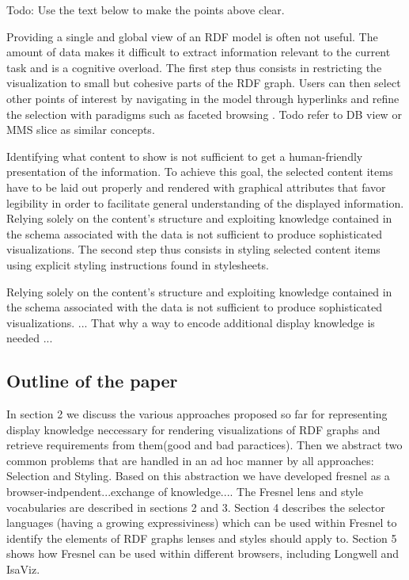 
Todo: Use the text below to make the points above clear.

Providing a single and global view of an RDF model is often not useful. The amount of data makes it difficult to extract information relevant to the current task and is a cognitive overload. The first step thus consists in restricting the visualization to small but cohesive parts of the RDF graph. Users can then select other points of interest by navigating in the model through hyperlinks and refine the selection with paradigms such as faceted browsing \cite{simile}. Todo refer to DB view or MMS slice\cite{Isakowitz:1995:RMS} as similar concepts.

Identifying what content to show is not sufficient to get a human-friendly presentation of the information. To achieve this goal, the selected content items have to be laid out properly and rendered with graphical attributes that favor legibility in order to facilitate general understanding of the displayed information. Relying solely on the content's structure and exploiting knowledge contained in the schema associated with the data is not sufficient to produce sophisticated visualizations. The second step thus consists in styling selected content items using explicit styling instructions found in stylesheets.

Relying solely on the content's structure and exploiting knowledge contained in the schema associated with the data is not sufficient to produce sophisticated visualizations. ... That why a way to encode additional display knowledge is needed ...

\subsection{Outline of the paper}

In section 2 we discuss the various approaches proposed so far for representing display knowledge neccessary for rendering visualizations of RDF graphs and retrieve requirements from them(good and bad paractices).  Then we abstract two common problems that are handled in an ad hoc manner by all approaches: Selection and Styling. Based on this abstraction we have developed fresnel as a browser-indpendent...exchange of knowledge.... The Fresnel lens and style vocabularies are described in sections 2 and 3. Section 4 describes the selector languages (having a growing expressiviness) which can be used within Fresnel to identify the elements of RDF graphs lenses and styles should apply to. Section 5 shows how Fresnel can be used within different browsers, including Longwell and IsaViz.
